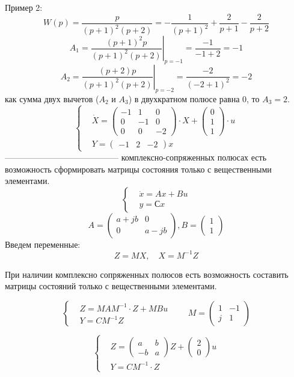 Пример 2:
\[W(p) = \frac{p}{(p+1)^2(p+2)} = - \frac{1}{(p+1)^2} + \frac{2}{p+1} -
\frac{2}{p+2}\]
\null
\[A_1 = \left.\frac{(p+1)^2p}{(p+1)^2(p+2)}\right|_{p=-1} = \frac{-1}{-1+2} = -1\]
\null
\[A_2 = \left.\frac{(p+2)p}{(p+1)^2(p+2)}\right|_{p=-2} = \frac{-2}{(-2+1)^2}
= -2\]
 как сумма двух вычетов ($A_2$ и $A_3$) в двухкратном полюсе равна 0, то
$A_3 = 2$.
\[\left\{\begin{aligned} 
&\dot X = \begin{pmatrix} -1 & 1 & 0\\
	0 & -1 & 0\\
	0 & 0 & -2
	\end{pmatrix} \cdot X + \begin{pmatrix} 0 \\ 1 \\ 1 \end{pmatrix} \cdot u\\
		&Y = \begin{pmatrix}-1 & 2 & -2\end{pmatrix} x
\end{aligned}\right.\]
-----------------------------------------
\null
{} комплексно-сопряженных полюсах есть возможность сформировать матрицы
состояния только с вещественными элементами.
\[\left\{\begin{aligned} &\dot x = Ax +Bu\\
		& y = Сx
	\end{aligned}\right.\]
		\[A = \begin{pmatrix} a + jb & 0 \\ 0 & a - jb \end{pmatrix},
		B = \begin{pmatrix} 1 \\ 1 \end{pmatrix}\]
Введем переменные:
\[Z = MX,\quad X = M^{-1}Z\]

При наличии комплексно сопряженных полюсов есть возможность составить матрицы
состояний только с вещественными элементами.

\[\left\{\begin{aligned}&Z = MAM^{-1} \cdot Z + MBu\\
												& Y = CM^{-1}Z\end{aligned}\right. \qquad
		M = \begin{pmatrix} 1 & -1 \\ j & 1 \end{pmatrix}
\]

\[\left\{\begin{aligned} & Z = \begin{pmatrix} a & b \\ -b & a \end{pmatrix} Z + \begin{pmatrix} 2 \\ 0 \end{pmatrix} u \\
												 & Y = CM^{-1}\cdot Z
\end{aligned}\right.\]


